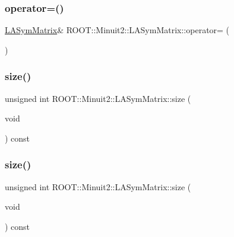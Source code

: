 \subsubsection{\texorpdfstring{operator=()}{operator=()}\hspace{0.1cm}{\footnotesize\ttfamily [21/21]}}
{\footnotesize\ttfamily \mbox{\hyperlink{classROOT_1_1Minuit2_1_1LASymMatrix}{L\+A\+Sym\+Matrix}}\& R\+O\+O\+T\+::\+Minuit2\+::\+L\+A\+Sym\+Matrix\+::operator= (\begin{DoxyParamCaption}\item[{const \mbox{\hyperlink{classROOT_1_1Minuit2_1_1ABObj}{A\+B\+Obj}}$<$ \mbox{\hyperlink{classROOT_1_1Minuit2_1_1sym}{sym}}, \mbox{\hyperlink{classROOT_1_1Minuit2_1_1VectorOuterProduct}{Vector\+Outer\+Product}}$<$ \mbox{\hyperlink{classROOT_1_1Minuit2_1_1ABObj}{A\+B\+Obj}}$<$ \mbox{\hyperlink{classROOT_1_1Minuit2_1_1vec}{vec}}, \mbox{\hyperlink{classROOT_1_1Minuit2_1_1LAVector}{L\+A\+Vector}}, double $>$, double $>$, double $>$ \&}]{ }\end{DoxyParamCaption})}

\mbox{\label{classROOT_1_1Minuit2_1_1LASymMatrix_af924c1e0eb1578716a8cb8940cc08563}} 
\subsubsection{\texorpdfstring{size()}{size()}\hspace{0.1cm}{\footnotesize\ttfamily [1/3]}}
{\footnotesize\ttfamily unsigned int R\+O\+O\+T\+::\+Minuit2\+::\+L\+A\+Sym\+Matrix\+::size (\begin{DoxyParamCaption}\item[{void}]{ }\end{DoxyParamCaption}) const\hspace{0.3cm}{\ttfamily [inline]}}

\mbox{\label{classROOT_1_1Minuit2_1_1LASymMatrix_af924c1e0eb1578716a8cb8940cc08563}} 
\subsubsection{\texorpdfstring{size()}{size()}\hspace{0.1cm}{\footnotesize\ttfamily [2/3]}}
{\footnotesize\ttfamily unsigned int R\+O\+O\+T\+::\+Minuit2\+::\+L\+A\+Sym\+Matrix\+::size (\begin{DoxyParamCaption}\item[{void}]{ }\end{DoxyParamCaption}) const\hspace{0.3cm}{\ttfamily [inline]}}

